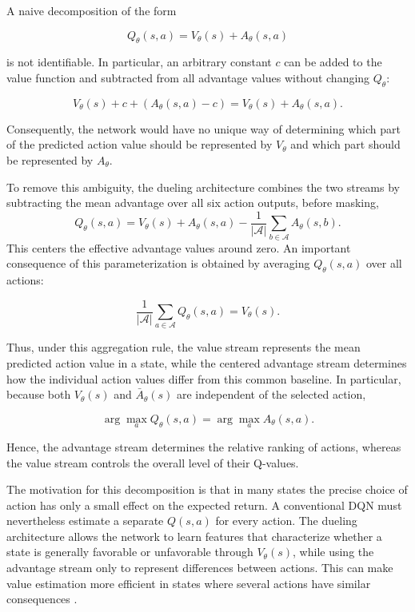 \documentclass[11pt,a4paper]{article}
\begin{document}
A naive decomposition of the form

$$
Q_\theta(s,a)=V_\theta(s)+A_\theta(s,a)
$$

is not identifiable. In particular, an arbitrary constant \(c\) can be added to the value function and subtracted from all advantage values without changing \(Q_\theta\):

$$
V_\theta(s)+c
+
\left(A_\theta(s,a)-c\right)
=
V_\theta(s)+A_\theta(s,a).
$$

Consequently, the network would have no unique way of determining which part of the predicted action value should be represented by \(V_\theta\) and which part should be represented by \(A_\theta\).

To remove this ambiguity, the dueling architecture combines the two streams by subtracting the mean advantage over all six action outputs, before masking,
\begin{equation}
Q_\theta(s,a)=V_\theta(s)+A_\theta(s,a)
-\frac{1}{|\mathcal{A}|}\sum_{b\in\mathcal{A}}A_\theta(s,b).
\label{eq:dueling}
\end{equation}
This centers the effective advantage values around zero. 
An important consequence of this parameterization is obtained by averaging \(Q_\theta(s,a)\) over all actions:

$$
\frac{1}{|\mathcal A|}
\sum_{a\in\mathcal A}Q_\theta(s,a)
=
V_\theta(s).
$$

Thus, under this aggregation rule, the value stream represents the mean predicted action value in a state, while the centered advantage stream determines how the individual action values differ from this common baseline. In particular, because both \(V_\theta(s)\) and \(\bar A_\theta(s)\) are independent of the selected action,

$$
\arg\max_{a} Q_\theta(s,a)
=
\arg\max_{a} A_\theta(s,a).
$$

Hence, the advantage stream determines the relative ranking of actions, whereas the value stream controls the overall level of their Q-values.

The motivation for this decomposition is that in many states the precise choice of action has only a small effect on the expected return. A conventional DQN must nevertheless estimate a separate \(Q(s,a)\) for every action. The dueling architecture allows the network to learn features that characterize whether a state is generally favorable or unfavorable through \(V_\theta(s)\), while using the advantage stream only to represent differences between actions. This can make value estimation more efficient in states where several actions have similar consequences \citep{wang2016dueling}.
\end{document}
